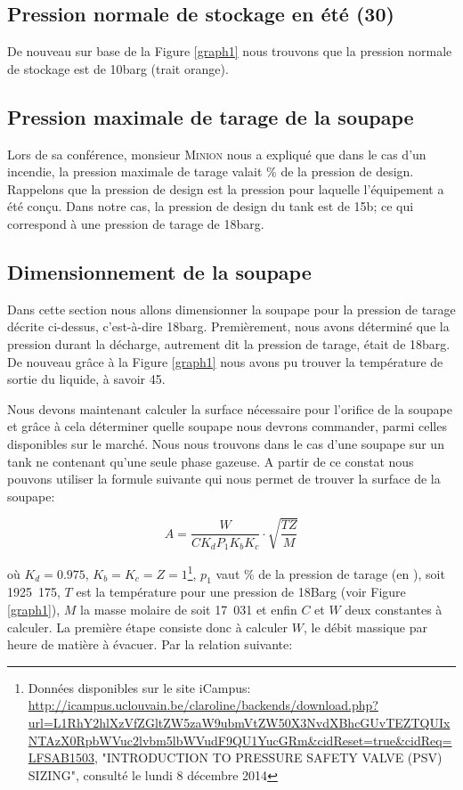 \subsection{Pression normale de stockage en été (\unit{30}{\celsius})}

De nouveau sur base de la Figure \ref{graph1} nous trouvons que la pression normale de stockage est de \unit{10}{barg} (trait orange).

\subsection{Pression maximale de tarage de la soupape}

Lors de sa conférence, monsieur \textsc{Minion} nous a expliqué que dans le cas d'un incendie, la pression maximale de tarage valait  \% de la pression de design. Rappelons que la pression de design est la pression pour laquelle l'équipement a été conçu. Dans notre cas, la pression de design du tank est de \unit{15}{b}; ce qui correspond à une pression de tarage de \unit{18}{barg}.

\subsection{Dimensionnement de la soupape}

Dans cette section nous allons dimensionner la soupape pour la pression de tarage décrite ci-dessus, c'est-à-dire \unit{18}{barg}.
Premièrement, nous avons déterminé que la pression durant la décharge, autrement dit la pression de tarage, était de \unit{18}{barg}. De nouveau grâce à la Figure \ref{graph1} nous avons pu trouver la température de sortie du liquide, à savoir \unit{45}{\celsius}.

Nous devons maintenant calculer la surface nécessaire pour l'orifice de la soupape et grâce à cela déterminer quelle soupape nous devrons commander, parmi celles disponibles sur le marché. Nous nous trouvons dans le cas d'une soupape sur un tank ne contenant qu'une seule phase gazeuse. A partir de ce constat nous pouvons utiliser la formule suivante qui nous permet de trouver la surface de la soupape:

\begin{equation}
A=\dfrac{W}{CK_dP_1K_bK_c}\cdot \sqrt{\dfrac{TZ}{M}}
\label{1}
\end{equation}

où $K_d=0.975$, $K_b=K_c=Z=1$\footnote{Données disponibles sur le site iCampus: \url{http://icampus.uclouvain.be/claroline/backends/download.php?url=L1RhY2hlXzVfZGltZW5zaW9ubmVtZW50X3NvdXBhcGUvTEZTQUIxNTAzX0RpbWVuc2lvbm5lbWVudF9QU1YucGRm&cidReset=true&cidReq=LFSAB1503}, "INTRODUCTION TO PRESSURE SAFETY VALVE (PSV) SIZING", consulté le lundi 8 décembre 2014}, $p_1$ vaut  \% de la pression de tarage (en \bbar), soit \unit{1925.175}{\kilo \pascal}, $T$ est la température pour une pression de \unit{18}{Barg} (voir Figure \ref{graph1}), $M$ la masse molaire de  soit \unit{17.031}{\gram \per \mole} et enfin $C$ et $W$ deux constantes à calculer. La première étape consiste donc à calculer $W$, le débit massique par heure de matière à évacuer. Par la relation suivante:

